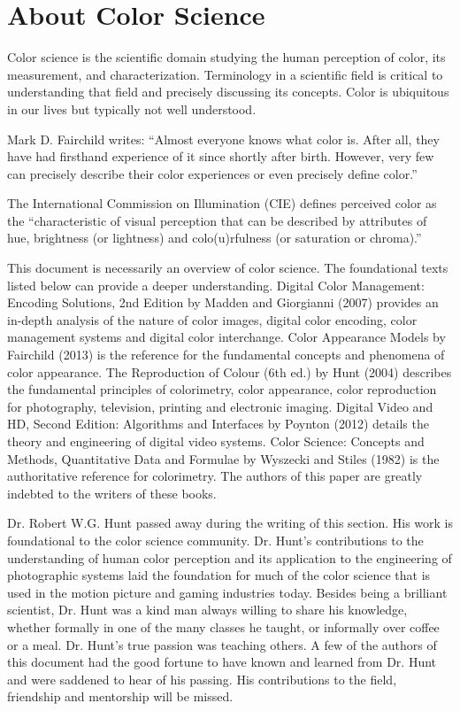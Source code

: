\section{About Color Science}

Color science is the scientific domain studying the human perception of color, its measurement, and characterization. Terminology in a scientific field is critical to understanding that field and precisely discussing its concepts. Color is ubiquitous in our lives but typically not well understood.

Mark D. Fairchild writes:
“Almost everyone knows what color is. After all, they have had firsthand experience of it since shortly after birth. However, very few can precisely describe their color experiences or even precisely define color.”

The International Commission on Illumination (CIE) defines perceived color as the “characteristic of visual perception that can be described by attributes of hue, brightness (or lightness) and colo(u)rfulness (or saturation or chroma).”

This document is necessarily an overview of color science. The foundational texts listed below can provide a deeper understanding.
Digital Color Management: Encoding Solutions, 2nd Edition by Madden and Giorgianni (2007) provides an in-depth analysis of the nature of color images, digital color encoding, color management systems and digital color interchange.
Color Appearance Models by Fairchild (2013) is the reference for the fundamental concepts and phenomena of color appearance.
The Reproduction of Colour (6th ed.) by Hunt (2004) describes the fundamental principles of colorimetry, color appearance, color reproduction for photography, television, printing and electronic imaging.
Digital Video and HD, Second Edition: Algorithms and Interfaces by Poynton (2012) details the theory and engineering of digital video systems.
Color Science: Concepts and Methods, Quantitative Data and Formulae by Wyszecki and Stiles (1982) is the authoritative reference for colorimetry.
The authors of this paper are greatly indebted to the writers of these books.

Dr. Robert W.G. Hunt passed away during the writing of this section. His work is foundational to the color science community. Dr. Hunt’s contributions to the understanding of human color perception and its application to the engineering of photographic systems laid the foundation for much of the color science that is used in the motion picture and gaming industries today. Besides being a brilliant scientist, Dr. Hunt was a kind man always willing to share his knowledge, whether formally in one of the many classes he taught, or informally over coffee or a meal. Dr. Hunt’s true passion was teaching others. A few of the authors of this document had the good fortune to have known and learned from Dr. Hunt and were saddened to hear of his passing. His contributions to the field, friendship and mentorship will be missed.

